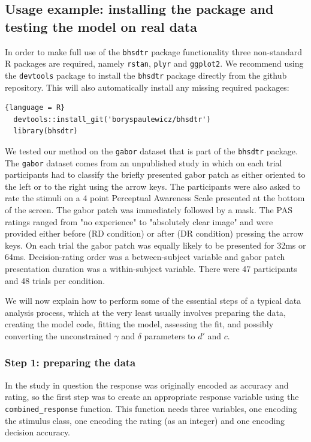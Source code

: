 \documentclass[oneside,a4paper]{article}
\begin{document}
\subsection{Usage example: installing the package and testing the
  model on real data}

In order to make full use of the \texttt{bhsdtr} package functionality
three non-standard R packages are required, namely \texttt{rstan},
\texttt{plyr} and \texttt{ggplot2}. We recommend using the
\texttt{devtools} package to install the \texttt{bhsdtr} package
directly from the github repository. This will also automatically
install any missing required packages:

\begin{lstlisting}{language = R}
  devtools::install_git('boryspaulewicz/bhsdtr')
  library(bhsdtr)
\end{lstlisting}

We tested our method on the \texttt{gabor} dataset that is part of the
\texttt{bhsdtr} package. The \texttt{gabor} dataset comes from an
unpublished study in which on each trial participants had to classify
the briefly presented gabor patch as either oriented to the left or to
the right using the arrow keys. The participants were also asked to
rate the stimuli on a 4 point Perceptual Awareness Scale
\cite{ramsoy2004introspection} presented at the bottom of the
screen. The gabor patch was immediately followed by a mask. The PAS
ratings ranged from "no experience" to "absolutely clear image" and
were provided either before (RD condition) or after (DR condition)
pressing the arrow keys. On each trial the gabor patch was equally
likely to be presented for 32ms or 64ms. Decision-rating order was a
between-subject variable and gabor patch presentation duration was a
within-subject variable. There were 47 participants and 48 trials per
condition.

We will now explain how to perform some of the essential steps of a
typical data analysis process, which at the very least usually
involves preparing the data, creating the model code, fitting the
model, assessing the fit, and possibly converting the unconstrained
$\gamma$ and $\delta$ parameters to $d'$ and $c$.

\subsubsection{Step 1: preparing the data}

In the study in question the response was originally encoded as
accuracy and rating, so the first step was to create an appropriate
response variable using the \texttt{combined\_response} function. This
function needs three variables, one encoding the stimulus class, one
encoding the rating (as an integer) and one encoding decision
accuracy.
\end{document}
